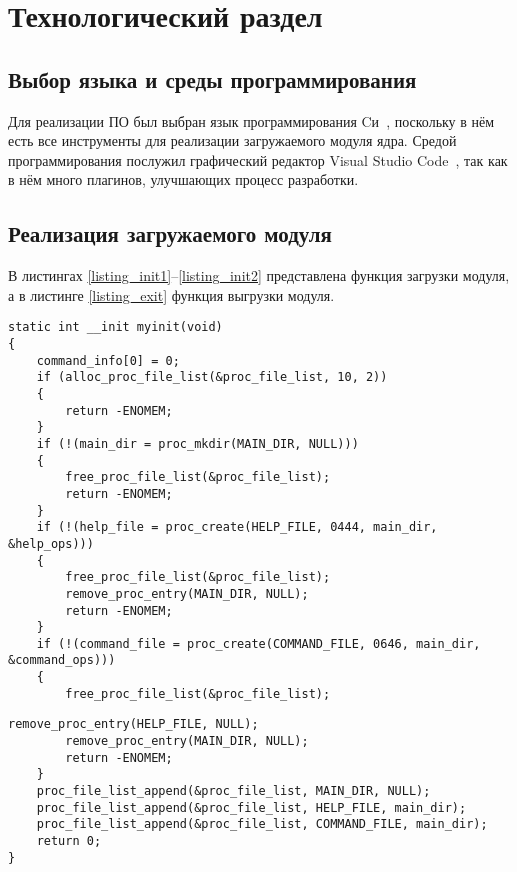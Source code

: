 \chapter{Технологический раздел}

\section{Выбор языка и среды программирования}

Для реализации ПО был выбран язык программирования Cи~\cite{c}, поскольку в нём есть все инструменты для реализации загружаемого модуля ядра. Средой программирования послужил графический редактор Visual Studio Code~\cite{vscode}, так как в нём много плагинов, улучшающих процесс разработки.

\section{Реализация загружаемого модуля}

В листингах \ref{listing_init1}--\ref{listing_init2} представлена функция загрузки модуля, а в листинге \ref{listing_exit} функция выгрузки модуля.

\begin{center}
	\begin{lstlisting}[label=listing_init1,caption=Функция загрузки модуля]
static int __init myinit(void)
{   
	command_info[0] = 0;
	if (alloc_proc_file_list(&proc_file_list, 10, 2))
	{
		return -ENOMEM;
	}
	if (!(main_dir = proc_mkdir(MAIN_DIR, NULL)))
	{
		free_proc_file_list(&proc_file_list);
		return -ENOMEM;
	}
	if (!(help_file = proc_create(HELP_FILE, 0444, main_dir, &help_ops)))
	{
		free_proc_file_list(&proc_file_list);
		remove_proc_entry(MAIN_DIR, NULL);
		return -ENOMEM;
	}
	if (!(command_file = proc_create(COMMAND_FILE, 0646, main_dir, &command_ops)))
	{
		free_proc_file_list(&proc_file_list);
	\end{lstlisting}
\end{center}

\begin{center}
	\begin{lstlisting}[label=listing_init2,caption=Функция загрузки модуля]
		remove_proc_entry(HELP_FILE, NULL);
		remove_proc_entry(MAIN_DIR, NULL);
		return -ENOMEM;
	}
	proc_file_list_append(&proc_file_list, MAIN_DIR, NULL);
	proc_file_list_append(&proc_file_list, HELP_FILE, main_dir);
	proc_file_list_append(&proc_file_list, COMMAND_FILE, main_dir);
	return 0;
}
	\end{lstlisting}
\end{center}

